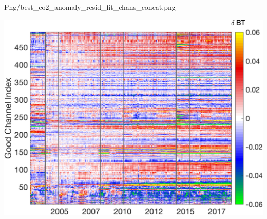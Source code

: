 \documentclass[10pt,t]{beamer}
\begin{document}
\begin{frame}[label={sec:org14d8281}]{Png/best\_co2\_anomaly\_resid\_fit\_chans\_concat.png}
\begin{center}
\includegraphics[width=0.7\linewidth]{./Figs/Png/best_co2_anomaly_resid_fit_chans_concat.png}
\end{center}
\end{frame}
\end{document}
